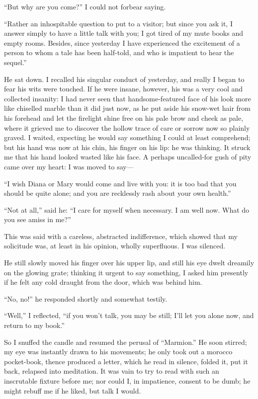 \enquote{But why are you come?} I could not forbear saying.

\enquote{Rather an inhospitable question to put to a visitor; but since
you ask it, I answer simply to have a little talk with you; I got tired
of my mute books and empty rooms. Besides, since yesterday I have
experienced the excitement of a person to whom a tale has been
half-told, and who is impatient to hear the sequel.}

He sat down. I recalled his singular conduct of yesterday, and really I
began to fear his wits were touched. If he were insane, however, his
was a very cool and collected insanity: I had never seen that
handsome-featured face of his look more like chiselled marble than it
did just now, as he put aside his snow-wet hair from his forehead and
let the firelight shine free on his pale brow and cheek as pale, where
it grieved me to discover the hollow trace of care or sorrow now so
plainly graved. I waited, expecting he would say something I could at
least comprehend; but his hand was now at his chin, his finger on his
lip: he was thinking. It struck me that his hand looked wasted like his
face. A perhaps uncalled-for gush of pity came over my heart: I was
moved to say---

\enquote{I wish Diana or Mary would come and live with you: it is too
bad that you should be quite alone; and you are recklessly rash about
your own health.}

\enquote{Not at all,} said he: \enquote{I care for myself when
necessary. I am well now. What do you see amiss in me?}

This was said with a careless, abstracted indifference, which showed
that my solicitude was, at least in his opinion, wholly superfluous. I
was silenced.

He still slowly moved his finger over his upper lip, and still his eye
dwelt dreamily on the glowing grate; thinking it urgent to say
something, I asked him presently if he felt any cold draught from the
door, which was behind him.

\enquote{No, no!} he responded shortly and somewhat testily.

\enquote{Well,} I reflected, \enquote{if you won't talk, you may be
still; I'll let you alone now, and return to my book.}

So I snuffed the candle and resumed the perusal of \enquote{Marmion.} 
He soon stirred; my eye was instantly drawn to his movements; he only
took out a morocco pocket-book, thence produced a letter, which he read
in silence, folded it, put it back, relapsed into meditation. It was
vain to try to read with such an inscrutable fixture before me; nor
could I, in impatience, consent to be dumb; he might rebuff me if he
liked, but talk I would.

